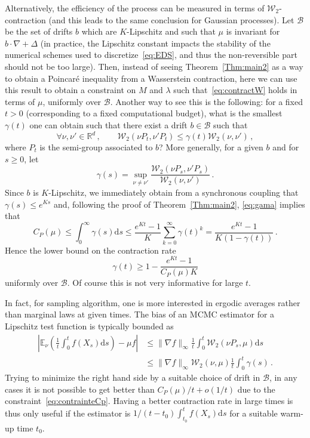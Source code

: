 \documentclass[10pt]{amsart}
\theoremstyle{definition}\newtheorem{defi}[theo]{Definition}\newtheorem{rema}[theo]{Remark}\newtheorem{exam}[theo]{Example}\newtheorem{exem}[theo]{Example}\newtheorem{nota}[theo]{Notation}
\newcommand{\R}{\mathbb R}
\newcommand{\bbE}{\mathbb E}
\newcommand{\clW}{\mathcal W}
\newcommand{\clB}{\mathcal B}
\newcommand{\dd}{\mathrm{d}}
\newcommand{\na}{\nabla}
\newcommand{\1}{\mathbbm{1}}
\newcommand{\nv}[1]{#1}
\let\oldforall\forall
\renewcommand*{\forall}{\mathrel{\oldforall}}
\begin{document}
Alternatively, the efficiency of the process can be measured in term\nv{s} of $\clW_2$-contraction (and this leads to the same conclusion for Gaussian processes). Let $\clB$ be the set of drifts $b$ which are $K$-Lipschitz and such that $\mu$ is invariant for $b\cdot \na +\Delta$ (in practice, the Lipschitz constant impacts the stability of the numerical schemes used to discretize~\eqref{eq:EDS}, and thus the non-reversible part should not be too large). Then, instead of seeing Theorem~\ref{Thm:main2} as a way to obtain a Poincaré inequality from a Wasserstein contraction, here we can use this result to obtain a constraint on $M$ and $\lambda$ such that~\eqref{eq:contractW} holds in term\nv{s} of $\mu$, uniformly over $\clB$. Another way to see this is the following: for a fixed $t>0$ (corresponding to a fixed computational budget), what is the smallest $\gamma(t)$ one can obtain such that there exist a drift $b\in\clB$ such that
\begin{equation}\label{eq:gama}
\forall \nu,\nu'\in\R^d\,,\qquad \clW_2(\nu P_t,\nu' P_t) \leqslant \gamma(t) \clW_2(\nu,\nu')\,,
\end{equation}
where $P_t$ is the semi-group associated to $b$? More generally, for a given $b$ and for $s\geqslant 0$, let
\[
\gamma(s) = \sup_{\nu\neq \nu'} \frac{\clW_2(\nu P_s,\nu' P_s)}{\clW_2(\nu,\nu')}\,.
\]
Since $b$ is $K$-Lipschitz, we immediately obtain from a synchronous coupling that $\gamma(s)\leqslant e^{Ks}$ and, following the proof of Theorem~\ref{Thm:main2}, \eqref{eq:gama} implies that
\begin{equation}\label{eq:contrainteCp}
C_P(\mu) \leqslant \int_0^\infty \gamma(s)\dd s \leqslant \frac{e^{Kt}-1}{K}\sum_{k=0}^\infty \gamma(t)^k = \frac{e^{Kt}-1}{K(1-\gamma(t))} \,.
\end{equation}
Hence the lower bound on the contraction rate
\[
\gamma(t) \geqslant 1 - \frac{e^{Kt}-1}{C_P(\mu)K}
\]
uniformly over $\clB$. Of course this is not very informative for large $t$.

In fact, for sampling algorithm, one is more interested in ergodic averages rather than marginal laws at given times. The bias of an MCMC estimator for a Lipschitz test function is typically bounded as
\begin{align*}
\left|\bbE_\nu\left( \frac{1}{t}\int_0^t f(X_s) \dd s\right) - \mu f \right| &\leqslant \|\na f\|_\infty \frac1t\int_0^t \clW_2(\nu P_s,\mu) \dd s\\ &\leqslant \|\na f\|_\infty \clW_2(\nu,\mu) \frac1t \int_0^t \gamma(s)\,.
\end{align*}
Trying to minimize the right hand side by a suitable choice of drift in $\clB$, in any cases it is not possible to get better than $C_P(\mu)/t + o(1/t)$ due to the constraint~\eqref{eq:contrainteCp}. Having a better contraction rate in large times is thus only useful if the estimator is $1/(t-t_0)\int_{t_0}^t f(X_s)\dd s$ for a suitable warm-up time $t_0$.
\end{document}
